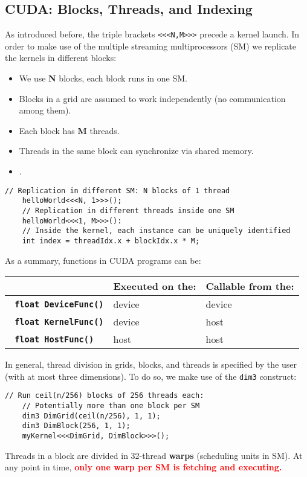\subsection{CUDA: Blocks, Threads, and Indexing}
As introduced before, the triple brackets \texttt{<<<N,M>>>} precede a kernel launch.
In order to make use of the multiple streaming multiprocessors (SM) we replicate the kernels in different blocks:
\begin{itemize}
    \item We use \textbf{N} blocks, each block runs in one SM.
    \item Blocks in a grid are assumed to work independently (no communication among them).
    \item Each block has \textbf{M} threads.
    \item Threads in the same block can synchronize via shared memory.
    \item \textbf{\color{red}{CUDA only allows for synchronization among threads in the same block.}}.
\end{itemize}
\begin{lstlisting}[style=cuda,caption={Example of a kernel definition and call.}]
    // Replication in different SM: N blocks of 1 thread
    helloWorld<<<N, 1>>>();
    // Replication in different threads inside one SM
    helloWorld<<<1, M>>>():
    // Inside the kernel, each instance can be uniquely identified
    int index = threadIdx.x + blockIdx.x * M;
\end{lstlisting}
As a summary, functions in CUDA programs can be:
\begin{table}[h!]
    \centering
    \begin{tabular}{p{} p{} p{}}
        \hline
        & \textbf{Executed on the:} & \textbf{Callable from the:} \\[3pt] \hline \hline
        \textbf{\texttt{\color{blue}{\_\_device\_\_} \color{black}float DeviceFunc()}} & device & device \\[3pt]
        \textbf{\texttt{\color{blue}{\_\_global\_\_} \color{black}float KernelFunc()}} & device & host \\[3pt]
        \textbf{\texttt{\color{blue}{\_\_host\_\_} \color{black}float HostFunc()}} & host & host \\[3pt] \hline \hline
    \end{tabular}
\end{table}

In general, thread division in grids, blocks, and threads is specified by the user (with at most three dimensions).
To do so, we make use of the \texttt{dim3} construct:
\begin{lstlisting}[style=cuda,caption={Example of a kernel definition and call.}]
    // Run ceil(n/256) blocks of 256 threads each:
    // Potentially more than one block per SM
    dim3 DimGrid(ceil(n/256), 1, 1);
    dim3 DimBlock(256, 1, 1);
    myKernel<<<DimGrid, DimBlock>>>();
\end{lstlisting}
Threads in a block are divided in 32-thread \textbf{warps} (scheduling units in SM).
At any point in time, \textbf{\textcolor{red}{only one warp per SM is fetching and executing.}}


